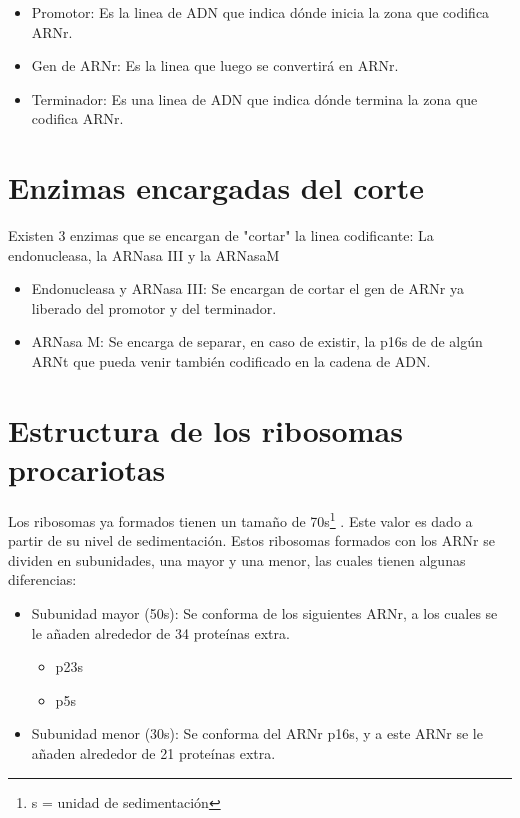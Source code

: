 \begin{itemize}
    \item Promotor: Es la linea de ADN que indica dónde inicia la zona que codifica ARNr.
    \item Gen de ARNr: Es la linea que luego se convertirá en ARNr.
    \item Terminador: Es una linea de ADN que indica dónde termina la zona que codifica ARNr.
\end{itemize}


\section{Enzimas encargadas del corte}

Existen 3 enzimas que se encargan de "cortar" la linea codificante: La endonucleasa, la ARNasa III y la ARNasaM

\begin{itemize}
    \item Endonucleasa y ARNasa III: Se encargan de cortar el gen de ARNr ya liberado del promotor y del terminador.
    \item ARNasa M: Se encarga de separar, en caso de existir, la p16s de de algún ARNt que pueda venir también codificado en la cadena de ADN.
\end{itemize}

\section{Estructura de los ribosomas procariotas}

Los ribosomas ya formados tienen un tamaño de 70s\footnote{s = unidad de sedimentación} . Este valor es dado a partir de su nivel de sedimentación.
Estos ribosomas formados con los ARNr se dividen en subunidades, una mayor y una menor, las cuales tienen algunas diferencias:

\begin{itemize}
    \item Subunidad mayor (50s): Se conforma de los siguientes ARNr, a los cuales se le añaden alrededor de 34 proteínas extra.
        \begin{itemize}
            \item p23s
            \item p5s
        \end{itemize}
    
    \item Subunidad menor (30s): Se conforma del ARNr p16s, y a este ARNr se le añaden alrededor de 21 proteínas extra. 
\end{itemize}

